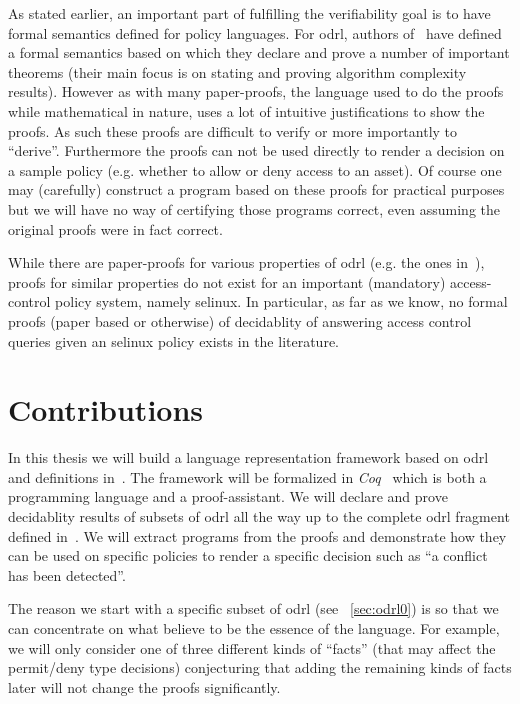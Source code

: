 As stated earlier, an important part of fulfilling the verifiability goal is to have formal semantics defined for policy languages. For \ac{odrl}, authors of~\cite{pucella2006} have defined a formal semantics based on which they declare and prove a number of important theorems (their main focus is on stating and proving algorithm complexity results). However as with many paper-proofs, the language used to do the proofs while mathematical in nature, uses a lot of intuitive justifications to show the proofs. As such these proofs are difficult to verify or more importantly to ``derive''. Furthermore the proofs can not be used directly to render a decision on a sample policy (e.g. whether to allow or deny access to an asset). Of course one may (carefully) construct a program based on these proofs for practical purposes but we will have no way of certifying those programs correct, even assuming the original proofs were in fact correct.

While there are paper-proofs for various properties of \ac{odrl} (e.g. the ones in~\cite{pucella2006}), proofs for similar properties do not exist for an important (mandatory) access-control policy system, namely \ac{selinux}. In particular, as far as we know, no formal proofs (paper based or otherwise) of decidablity of answering access control queries given an \ac{selinux} policy exists in the literature. 


\section{Contributions}

In this thesis we will build a language representation framework based on \ac{odrl} and definitions in~\cite{pucella2006}. The framework will be formalized in \emph{Coq}~\cite{BC04} which is both a programming language and a proof-assistant. We will declare and prove decidablity results of subsets of \ac{odrl} all the way up to the complete \ac{odrl} fragment defined in~\cite{pucella2006}. We will extract programs from the proofs and demonstrate how they can be used on specific policies to render a specific decision such as ``a conflict has been detected''. 

The reason we start with a specific subset of \ac{odrl} (see ~\ref{sec:odrl0}) is so that we can concentrate on what believe to be the essence of the language. For example, we will only consider one of three different kinds of ``facts'' (that may affect the permit/deny type decisions) conjecturing that adding the remaining kinds of facts later will not change the proofs significantly.

